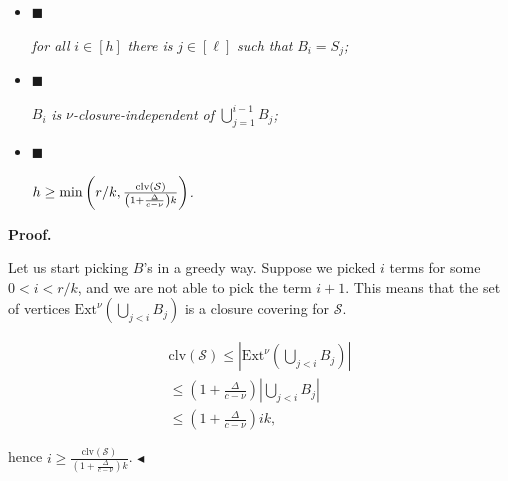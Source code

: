 \documentclass[10pt,a4paper]{article}
\begin{document}
\begin{itemize}


\item[] 
$\blacksquare$ 


\emph{for all }$i\in[h]$\emph{ there is }$j\in[\ell]$\emph{ such that }$B_{i}=S_{j}$\emph{;}\par





\item[] 
$\blacksquare$ 


$B_{i}$\emph{ is }$\nu$\emph{-closure-independent of }$\bigcup\limits_{j=1}^{i-1}B_{j}$\emph{;}\par





\item[] 
$\blacksquare$ 


$h\geq\min\left(r/k,\frac{\mathrm{clv}\left(\mathcal{S}\right)}{\left(1+\frac{%
\Delta}{c-\nu}\right)k}\right)$\emph{.}\par





\end{itemize}






\par\medskip\noindent\textbf{Proof.}\par




Let us start picking $B$’s in a greedy way. Suppose we picked $i$
terms for some $0<i<r/k$, and we are not able to pick the
term $i+1$. This means that the set of vertices
$\mathrm{Ext}^{\nu}\left(\bigcup\limits_{j<i}B_{j}\right)$ is a closure covering
for $\mathcal{S}$.\par


\[\begin{gathered}
\displaystyle\mathrm{clv}\left(\mathcal{S}\right) \displaystyle\leq|\mathrm{Ext}^{\nu}\left(\bigcup\limits_{j<i}B_{j}\right)| \\
\displaystyle\leq\left(1+\frac{\Delta}{c-\nu}\right)|\bigcup\limits_{j<i}B_{j}| \\
\displaystyle\leq\left(1+\frac{\Delta}{c-\nu}\right)ik,
\end{gathered}\]


hence $i\geq\frac{\mathrm{clv}\left(\mathcal{S}\right)}{\left(1+\frac{\Delta}{c-\nu}%
\right)k}$.
$\blacktriangleleft$\par
\end{document}
